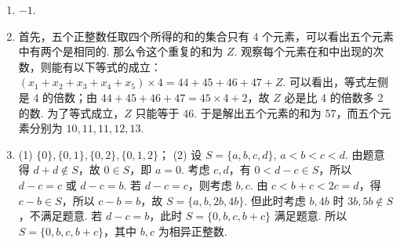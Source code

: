 \documentclass[a4paper,11pt]{article}
\begin{document}
\begin{enumerate}
\item $-1$.

\item 首先，五个正整数任取四个所得的和的集合只有 4 个元素，可以看出五个元素中有两个是相同的. 那么令这个重复的和为 $Z$. 观察每个元素在和中出现的次数，则能有以下等式的成立：$(x_1+x_2+x_3+x_4+x_5)\times 4 = 44+45+46+47+Z$. 可以看出，等式左侧是 4 的倍数；由 $44+45+46+47=45\times 4+2$，故 $Z$ 必是比 4 的倍数多 2 的数. 为了等式成立，$Z$ 只能等于 46. 于是解出五个元素的和为 57，而五个元素分别为 $10,11,11,12,13$.

\item (1) $\{0\},\{0,1\},\{0,2\},\{0,1,2\}$；
(2) 设 $S=\{a,b,c,d\},\, a<b<c<d$. 由题意得 $d+d\notin S$，故 $0\in S$，即 $a=0$. 考虑 $c,d$，有 $0<d-c\in S$，所以 $d-c=c$ 或 $d-c=b$. 若 $d-c=c$，则考虑 $b,c$. 由 $c<b+c<2c=d$，得 $c-b\in S$，所以 $c-b=b$，故 $S=\{a,b,2b,4b\}$. 但此时考虑 $b,4b$ 时 $3b,5b\notin S$，不满足题意. 若 $d-c=b$，此时 $S=\{0,b,c,b+c\}$ 满足题意. %
所以 $S=\{0,b,c,b+c\}$，其中 $b,c$ 为相异正整数.
\end{enumerate}
\fi
\end{document}
